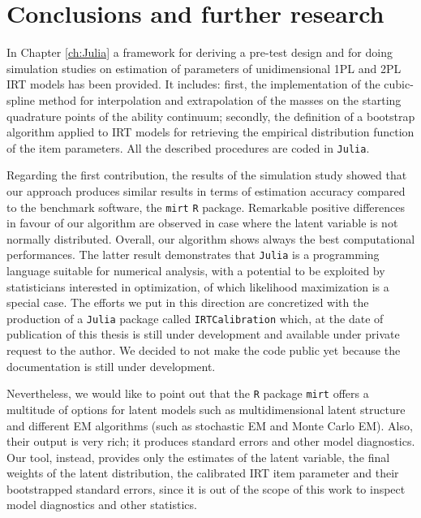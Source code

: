 \chapter{Conclusions and further research}\label{ch:conclusions}



In Chapter \ref{ch:Julia} a framework for deriving a pre-test design and for doing simulation studies on estimation of parameters of unidimensional 1PL and 2PL IRT models has been provided. It includes: first, the implementation of the cubic-spline method for interpolation and extrapolation of the masses on the starting quadrature points of the ability continuum; secondly, the definition of a bootstrap algorithm applied to IRT models for retrieving the empirical distribution function of the item parameters. All the described procedures are coded in \texttt{Julia}.

Regarding the first contribution, the results of the simulation study showed that our approach produces similar results in terms of estimation accuracy compared to the benchmark software, the \texttt{mirt} \texttt{R} package. Remarkable positive differences in favour of our algorithm are observed in case where the latent variable is not normally distributed. Overall, our algorithm shows always the best computational performances. The latter result demonstrates that \texttt{Julia} is a programming language suitable for numerical analysis, with a potential to be exploited by statisticians interested in optimization, of which likelihood maximization is a special case. 
The efforts we put in this direction are concretized with the production of a \texttt{Julia} package called \texttt{IRTCalibration} which, at the date of publication of this thesis is still under development and available under private request to the author. We decided to not make the code public yet because the documentation is still under development.

Nevertheless, we would like to point out that the \texttt{R} package \texttt{mirt} offers a multitude of options for latent  models such as multidimensional latent structure and different EM algorithms (such as stochastic EM and Monte Carlo EM). Also, their output is very rich; it produces standard errors and other model diagnostics. Our tool, instead, provides only the estimates of the latent variable, the final weights of the latent distribution, the calibrated IRT item parameter and their bootstrapped standard errors, since it is out of the scope of this work to inspect model diagnostics and other statistics. 

